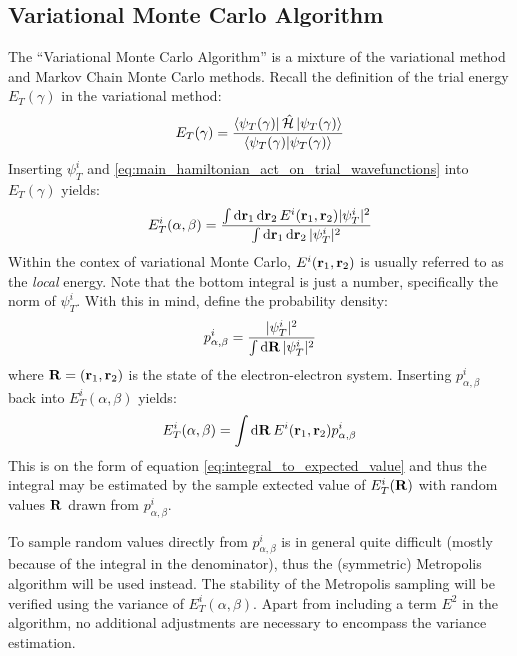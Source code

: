 \documentclass[nofootinbib,reprint,english]{revtex4-1}
\newcommand{\hatHH}{\hat{\mathcal{H}}}
\begin{document}
\subsection{Variational Monte Carlo Algorithm}
The ``Variational Monte Carlo Algorithm'' is a mixture of the variational method and Markov Chain Monte Carlo methods. Recall the definition of the trial energy \(E_T(\gamma)\) in the variational method:
\[E_T(\gamma)=\frac{\bra{\psi_T(\gamma)}\hatHH\ket{\psi_T(\gamma)}}{\braket{\psi_T(\gamma)}}\]
Inserting \(\psi_T^i\) and \eqref{eq:main_hamiltonian_act_on_trial_wavefunctions} into \(E_T(\gamma)\) yields:
\begin{equation*}
E_T^i(\alpha,\beta)=\frac{\int\dd{\vb{r}_1}\dd{\vb{r}_2}E^i(\vb{r}_1,\vb{r}_2)|\psi_T^i|^2}{\int\dd{\vb{r}_1}\dd{\vb{r}_2}|\psi_T^i|^2}
\end{equation*}
Within the contex of variational Monte Carlo, \(E^i(\vb{r}_1,\vb{r}_2)\) is usually referred to as the \emph{local} energy. Note that the bottom integral is just a number, specifically the norm of \(\psi_T^i\). With this in mind, define the probability density:
\begin{equation}
p_{\alpha,\beta}^i=\frac{|\psi_T^i|^2}{\int\dd{\vb{R}}|\psi_T^i|^2}
\end{equation}
where \(\vb{R}=(\vb{r}_1,\vb{r}_2)\) is the state of the electron-electron system. Inserting \(p_{\alpha,\beta}^i\) back into \(E_T^i(\alpha,\beta)\) yields:
\begin{equation}
E_T^i(\alpha,\beta)=\int\dd{\vb{R}}E^i(\vb{r}_1,\vb{r}_2)p_{\alpha,\beta}^i
\end{equation}
This is on the form of equation \eqref{eq:integral_to_expected_value} and thus the integral may be estimated by the sample extected value of \(E_T^i(\vb{R})\) with random values \(\vb{R}\) drawn from \(p_{\alpha,\beta}^i\).

To sample random values directly from \(p_{\alpha,\beta}^i\) is in general quite difficult (mostly because of the integral in the denominator), thus the (symmetric) Metropolis algorithm will be used instead. The stability of the Metropolis sampling will be verified using the variance of \(E_T^i(\alpha,\beta)\). Apart from including a term \(E^2\) in the algorithm, no additional adjustments are necessary to encompass the variance estimation.
\end{document}
